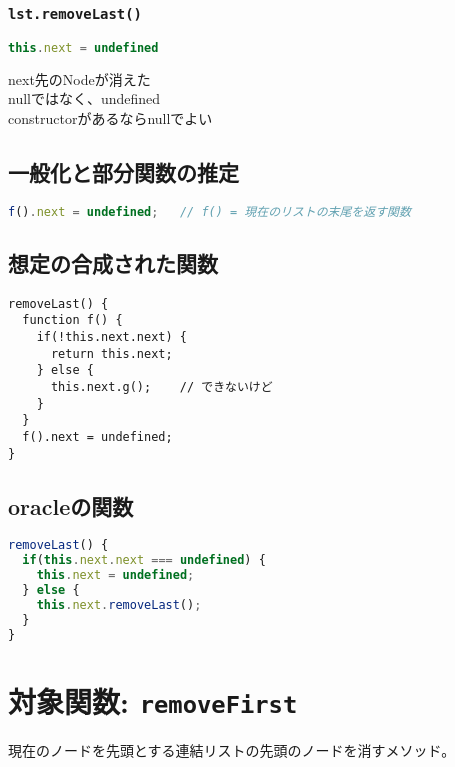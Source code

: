 \documentclass{article}
\begin{document}
\subsubsection{\texttt{lst.removeLast()}}
\begin{lstlisting}[language=JavaScript]
this.next = undefined
\end{lstlisting}

next先のNodeが消えた  \\
nullではなく、undefined  \\
constructorがあるならnullでよい 

\subsection{一般化と部分関数の推定}

\begin{lstlisting}[language=JavaScript]
f().next = undefined;   // f() = 現在のリストの末尾を返す関数
\end{lstlisting}

\subsection{想定の合成された関数}
\begin{lstlisting}
removeLast() {
  function f() {
    if(!this.next.next) {
      return this.next;
    } else {
      this.next.g();    // できないけど
    }
  }
  f().next = undefined;
}
\end{lstlisting}

\subsection{oracleの関数}
\begin{lstlisting}[language=JavaScript]
removeLast() {
  if(this.next.next === undefined) {
    this.next = undefined;
  } else {
    this.next.removeLast();
  }
}
\end{lstlisting}






\section{対象関数: \texttt{removeFirst}}
現在のノードを先頭とする連結リストの先頭のノードを消すメソッド。
\end{document}
